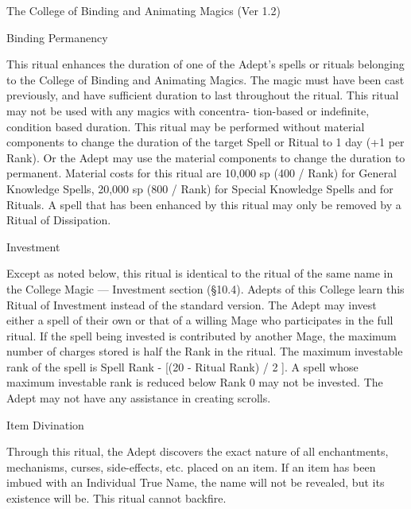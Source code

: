 \begin{Chapter}{The College of Binding and Animating Magics (Ver 1.2)}
\begin{ritual}[R-1]{Binding Permanency }
\begin{effects}
This ritual enhances the duration of one of the Adept’s spells or
rituals belonging to the College of Binding and Animating Magics. The
magic must have been cast previously, and have sufficient duration to
last throughout the ritual.  This ritual may not be used with any
magics with concentra- tion-based or indefinite, condition based
duration.  This ritual may be performed without material components to
change the duration of the target Spell or Ritual to 1 day (+1 per
Rank).  Or the Adept may use the material components to change the
duration to permanent.  Material costs for this ritual are 10,000 sp
(400 / Rank) for General Knowledge Spells, 20,000 sp (800 / Rank) for
Special Knowledge Spells and for Rituals.  A spell that has been
enhanced by this ritual may only be removed by a Ritual of
Dissipation.
\end{effects}
\end{ritual}

\begin{ritual}[R-2]{Investment }
\begin{effects}
Except as noted below, this ritual is identical to the ritual of the
same name in the College Magic — Investment section (§10.4).  Adepts
of this College learn this Ritual of Investment instead of the
standard version.  The Adept may invest either a spell of their own or
that of a willing Mage who participates in the full ritual. If the
spell being invested is contributed by another Mage, the maximum
number of charges stored is half the Rank in the ritual.  The maximum
investable rank of the spell is Spell Rank - [(20 - Ritual Rank) / 2
].  A spell whose maximum investable rank is reduced below Rank 0 may
not be invested. The Adept may not have any assistance in creating
scrolls.
\end{effects}
\end{ritual}

\begin{ritual}[R-3]{Item Divination}
\begin{effects}
Through this ritual, the Adept discovers the exact nature of all
enchantments, mechanisms, curses, side-effects, etc.  placed on an
item.  If an item has been imbued with an Individual True Name, the
name will not be revealed, but its existence will be. This ritual
cannot backfire.
\end{effects}
\end{ritual}


\end{Chapter}
